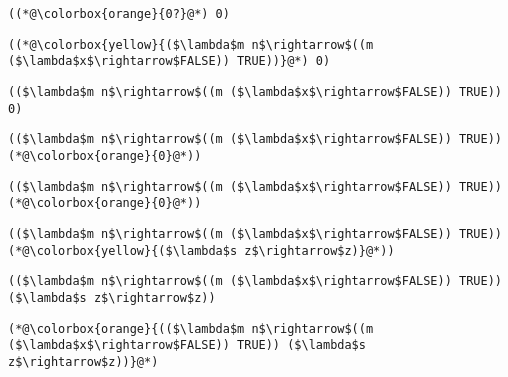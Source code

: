 \documentclass{beamer}
\begin{document}
\begin{frame}[fragile]{\CurrentSection}
\lstset{basicstyle=\ttfamily\small}\lstset{numbers=none}\lstset{language=ML}\begin{lstlisting}
((*@\colorbox{orange}{0?}@*) 0)
\end{lstlisting}
\pause\lstset{language=ML}\begin{lstlisting}
((*@\colorbox{yellow}{($\lambda$m n$\rightarrow$((m ($\lambda$x$\rightarrow$FALSE)) TRUE))}@*) 0)
\end{lstlisting}

\end{frame}

\begin{frame}[fragile]{\CurrentSection}
\lstset{basicstyle=\ttfamily\small}\lstset{numbers=none}\lstset{language=ML}\begin{lstlisting}
(($\lambda$m n$\rightarrow$((m ($\lambda$x$\rightarrow$FALSE)) TRUE)) 0)
\end{lstlisting}
\pause\lstset{language=ML}\begin{lstlisting}
(($\lambda$m n$\rightarrow$((m ($\lambda$x$\rightarrow$FALSE)) TRUE)) (*@\colorbox{orange}{0}@*))
\end{lstlisting}

\end{frame}

\begin{frame}[fragile]{\CurrentSection}
\lstset{basicstyle=\ttfamily\small}\lstset{numbers=none}\lstset{language=ML}\begin{lstlisting}
(($\lambda$m n$\rightarrow$((m ($\lambda$x$\rightarrow$FALSE)) TRUE)) (*@\colorbox{orange}{0}@*))
\end{lstlisting}
\pause\lstset{language=ML}\begin{lstlisting}
(($\lambda$m n$\rightarrow$((m ($\lambda$x$\rightarrow$FALSE)) TRUE)) (*@\colorbox{yellow}{($\lambda$s z$\rightarrow$z)}@*))
\end{lstlisting}

\end{frame}

\begin{frame}[fragile]{\CurrentSection}
\lstset{basicstyle=\ttfamily\small}\lstset{numbers=none}\lstset{language=ML}\begin{lstlisting}
(($\lambda$m n$\rightarrow$((m ($\lambda$x$\rightarrow$FALSE)) TRUE)) ($\lambda$s z$\rightarrow$z))
\end{lstlisting}
\pause\lstset{language=ML}\begin{lstlisting}
(*@\colorbox{orange}{(($\lambda$m n$\rightarrow$((m ($\lambda$x$\rightarrow$FALSE)) TRUE)) ($\lambda$s z$\rightarrow$z))}@*)
\end{lstlisting}

\end{frame}
\end{document}
